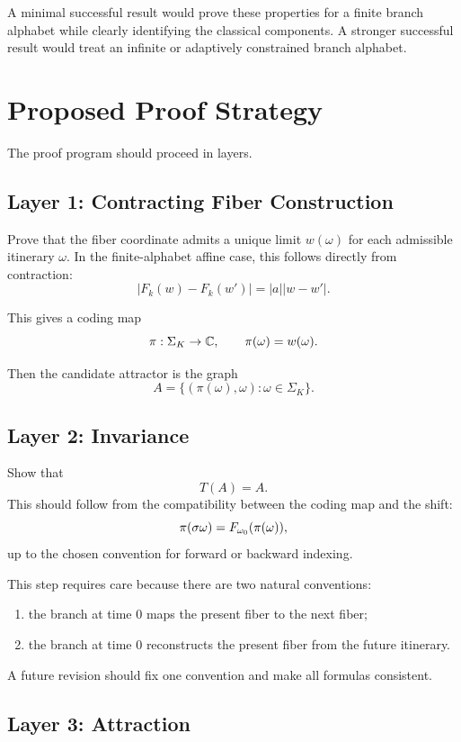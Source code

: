 	A minimal successful result would prove these properties for a finite branch alphabet while clearly identifying the classical components. A stronger successful result would treat an infinite or adaptively constrained branch alphabet.
	
	\section{Proposed Proof Strategy}
	
	The proof program should proceed in layers.
	
	\subsection{Layer 1: Contracting Fiber Construction}
	
	Prove that the fiber coordinate admits a unique limit \(w(\omega)\) for each admissible itinerary \(\omega\). In the finite-alphabet affine case, this follows directly from contraction:
	\[
	|F_k(w)-F_k(w')|=|a||w-w'|.
	\]
	
	This gives a coding map
	\[
	\pi:\Sigma_K\to\mathbb{C},
	\qquad
	\pi(\omega)=w(\omega).
	\]
	
	Then the candidate attractor is the graph
	\[
	A=\{(\pi(\omega),\omega):\omega\in\Sigma_K\}.
	\]
	
	\subsection{Layer 2: Invariance}
	
	Show that
	\[
	T(A)=A.
	\]
	This should follow from the compatibility between the coding map and the shift:
	\[
	\pi(\sigma\omega)=F_{\omega_0}(\pi(\omega)),
	\]
	up to the chosen convention for forward or backward indexing.
	
	This step requires care because there are two natural conventions:
	\begin{enumerate}
		\item the branch at time \(0\) maps the present fiber to the next fiber;
		\item the branch at time \(0\) reconstructs the present fiber from the future itinerary.
	\end{enumerate}
	A future revision should fix one convention and make all formulas consistent.
	
	\subsection{Layer 3: Attraction}
	

